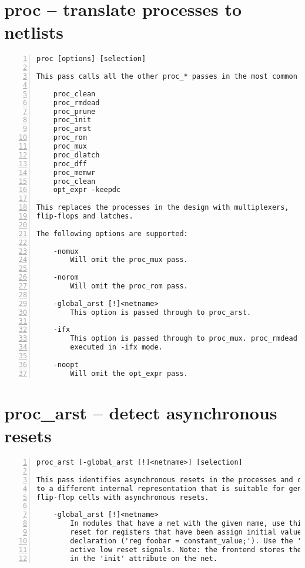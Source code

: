 \section{proc -- translate processes to netlists}
\label{cmd:proc}
\begin{lstlisting}[numbers=left,frame=single]
    proc [options] [selection]

This pass calls all the other proc_* passes in the most common order.

    proc_clean
    proc_rmdead
    proc_prune
    proc_init
    proc_arst
    proc_rom
    proc_mux
    proc_dlatch
    proc_dff
    proc_memwr
    proc_clean
    opt_expr -keepdc

This replaces the processes in the design with multiplexers,
flip-flops and latches.

The following options are supported:

    -nomux
        Will omit the proc_mux pass.

    -norom
        Will omit the proc_rom pass.

    -global_arst [!]<netname>
        This option is passed through to proc_arst.

    -ifx
        This option is passed through to proc_mux. proc_rmdead is not
        executed in -ifx mode.

    -noopt
        Will omit the opt_expr pass.
\end{lstlisting}

\section{proc\_arst -- detect asynchronous resets}
\label{cmd:proc_arst}
\begin{lstlisting}[numbers=left,frame=single]
    proc_arst [-global_arst [!]<netname>] [selection]

This pass identifies asynchronous resets in the processes and converts them
to a different internal representation that is suitable for generating
flip-flop cells with asynchronous resets.

    -global_arst [!]<netname>
        In modules that have a net with the given name, use this net as async
        reset for registers that have been assign initial values in their
        declaration ('reg foobar = constant_value;'). Use the '!' modifier for
        active low reset signals. Note: the frontend stores the default value
        in the 'init' attribute on the net.
\end{lstlisting}

